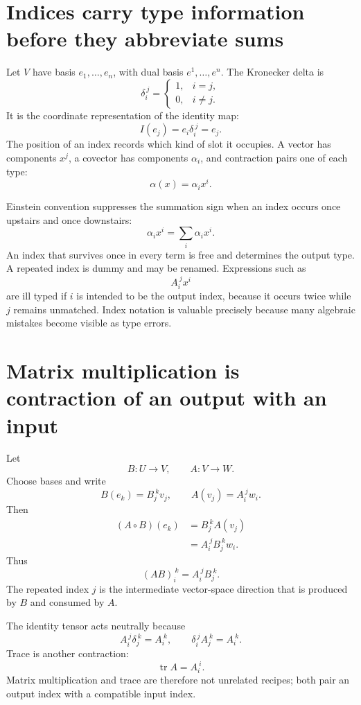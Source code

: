 
\section{Indices carry type information before they abbreviate sums}

Let \(V\) have basis \(e_1,\ldots,e_n\), with dual basis \(e^1,\ldots,e^n\).  The Kronecker delta is
\[
  \delta_i^{\ j}
  =
  \begin{cases}
    1,&i=j,\\
    0,&i\ne j.
  \end{cases}
\]
It is the coordinate representation of the identity map:
\[
  I(e_j)=e_i\delta_i^{\ j}=e_j.
\]
The position of an index records which kind of slot it occupies.  A vector has components \(x^j\), a covector has components \(\alpha_i\), and contraction pairs one of each type:
\[
  \alpha(x)=\alpha_i x^i.
\]

Einstein convention suppresses the summation sign when an index occurs once upstairs and once downstairs:
\[
  \alpha_i x^i
  =\sum_i\alpha_i x^i.
\]
An index that survives once in every term is free and determines the output type.  A repeated index is dummy and may be renamed.  Expressions such as
\[
  A_i^{\ j}x^i
\]
are ill typed if \(i\) is intended to be the output index, because it occurs twice while \(j\) remains unmatched.  Index notation is valuable precisely because many algebraic mistakes become visible as type errors.

\section{Matrix multiplication is contraction of an output with an input}

Let
\[
  B:U\to V,
  \qquad
  A:V\to W.
\]
Choose bases and write
\[
  B(e_k)=B_j^{\ k}v_j,
  \qquad
  A(v_j)=A_i^{\ j}w_i.
\]
Then
\[
\begin{aligned}
  (A\circ B)(e_k)
  &=B_j^{\ k}A(v_j)\\
  &=A_i^{\ j}B_j^{\ k}w_i.
\end{aligned}
\]
Thus
\[
  (AB)_i^{\ k}=A_i^{\ j}B_j^{\ k}.
\]
The repeated index \(j\) is the intermediate vector-space direction that is produced by \(B\) and consumed by \(A\).

The identity tensor acts neutrally because
\[
  A_i^{\ j}\delta_j^{\ k}=A_i^{\ k},
  \qquad
  \delta_i^{\ j}A_j^{\ k}=A_i^{\ k}.
\]
Trace is another contraction:
\[
  \operatorname{tr}A=A_i^{\ i}.
\]
Matrix multiplication and trace are therefore not unrelated recipes; both pair an output index with a compatible input index.

